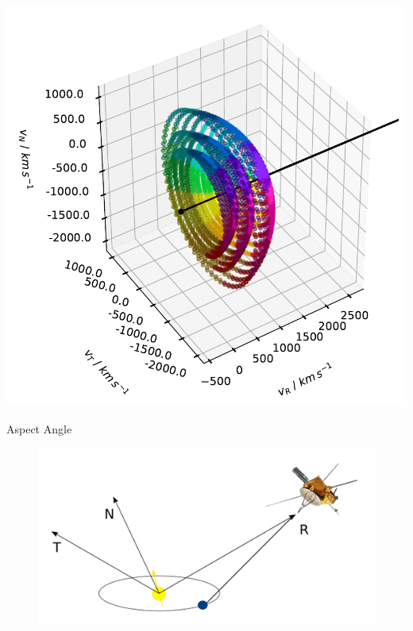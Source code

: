\documentclass{beamer}
\begin{document}


\begin{frame}{}
\includegraphics[scale=0.35]{Pics/coll_3shells.pdf}
\end{frame}



\begin{frame}{Aspect Angle}
\begin{figure}
	\includegraphics[scale=0.4]{Pics/RTN_AA.pdf}
\end{figure}
\end{frame}

\end{document}
